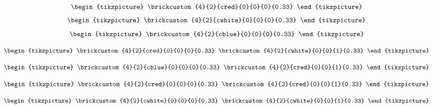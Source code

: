 \begin{forslides}

\begin{equation}\label{eq:lego-red1}
\begin{tikzpicture}
  \brickcustom{4}{2}{cred}{0}{0}{0}{0.33} %
\end{tikzpicture}
\end{equation}
\begin{equation}\label{eq:lego-white1}
\begin{tikzpicture}
  \brickcustom{4}{2}{cwhite}{0}{0}{0}{0.33} %
\end{tikzpicture}
\end{equation}
\begin{equation}\label{eq:lego-blue1}
\begin{tikzpicture}
  \brickcustom{4}{2}{cblue}{0}{0}{0}{0.33} %
\end{tikzpicture}
\end{equation}


\begin{equation}\label{eq:lego-red1-white1}
\begin{tikzpicture}
\brickcustom{4}{2}{cred}{0}{0}{0}{0.33}
\brickcustom{4}{2}{cwhite}{0}{0}{1}{0.33} %
\end{tikzpicture}
\end{equation}



\begin{equation}\label{eq:lego-blue1-red1}
\begin{tikzpicture}
\brickcustom{4}{2}{cblue}{0}{0}{0}{0.33}
\brickcustom{4}{2}{cred}{0}{0}{1}{0.33} %
\end{tikzpicture}
\end{equation}

\begin{equation}\label{eq:lego-red1-red1}
\begin{tikzpicture}
\brickcustom{4}{2}{cred}{0}{0}{0}{0.33}
\brickcustom{4}{2}{cred}{0}{0}{1}{0.33} %
\end{tikzpicture}
\end{equation}

\begin{equation}\label{eq:lego-white1-white1}
\begin{tikzpicture}
\brickcustom{4}{2}{cwhite}{0}{0}{0}{0.33}
\brickcustom{4}{2}{cwhite}{0}{0}{1}{0.33} %
\end{tikzpicture}
\end{equation}


\end{forslides}
